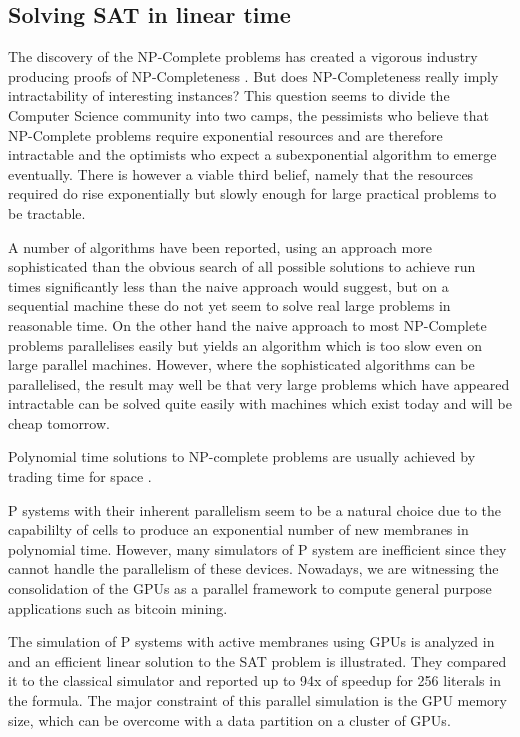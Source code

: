 
\subsection{Solving SAT in linear time} %
\label{sub:solving_sat_in_linear_time}

The discovery of the NP-Complete problems has created a vigorous industry producing proofs of NP-Completeness \cite{NPCompleteness}. But does NP-Completeness really imply intractability of interesting instances? This question seems to divide the Computer Science community into two camps, the pessimists who believe that NP-Complete problems require exponential resources and are therefore intractable and the optimists who expect a subexponential algorithm to emerge eventually. There is however a viable third belief, namely that the resources required do rise exponentially but slowly enough for large practical problems to be tractable.

A number of algorithms have been reported, using an approach more sophisticated than the obvious search of all possible solutions to achieve run times significantly less than the naive approach would suggest, but on a sequential machine these do not yet seem to solve real large problems in reasonable time. On the other hand the naive approach to most NP-Complete problems parallelises easily but yields an algorithm which is too slow even on large parallel machines. However, where the sophisticated algorithms can be parallelised, the result may well be that very large problems which have appeared intractable can be solved quite easily with machines which exist today and will be cheap tomorrow.

Polynomial time solutions to NP-complete problems are usually achieved by trading time for space \cite{Stamp03TimeMemoryTradeoff}.

P systems with their inherent parallelism seem to be a natural choice due to the capabililty of cells to produce an exponential number of new membranes in polynomial time. However, many simulators of P system are inefficient since they cannot handle the parallelism of these devices. Nowadays, we are witnessing the consolidation of the GPUs as a parallel framework to compute general purpose applications such as bitcoin mining.

The simulation of P systems with active membranes using GPUs is analyzed in \cite{Cecilia10SAT} and an efficient linear solution to the SAT problem is illustrated. They compared it to the classical simulator and reported up to 94x of speedup for 256 literals in the formula. The major constraint of this parallel simulation is the GPU memory size, which can be overcome with a data partition on a cluster of GPUs.

